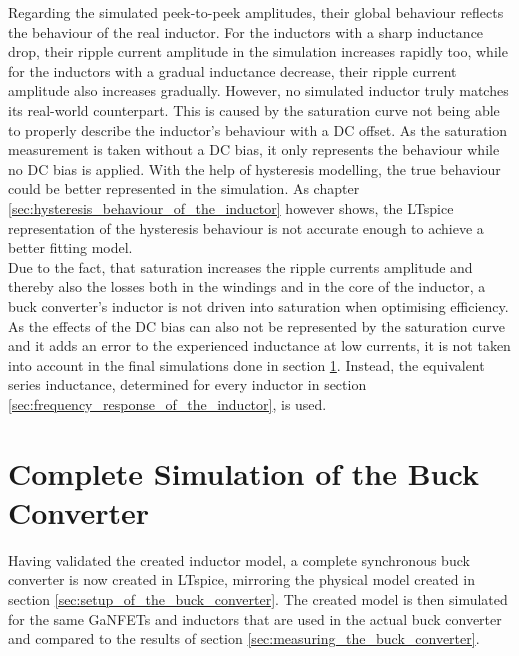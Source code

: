 Regarding the simulated peek-to-peek amplitudes, their global behaviour reflects the behaviour of the real inductor. For the inductors with a sharp inductance drop, their ripple current amplitude in the simulation increases rapidly too, while for the inductors with a gradual inductance decrease, their ripple current amplitude also increases gradually. However, no simulated inductor truly matches its real-world counterpart. This is caused by the saturation curve not being able to properly describe the inductor's behaviour with a \ac{DC} offset. As the saturation measurement is taken without a \ac{DC} bias, it only represents the behaviour while no \ac{DC} bias is applied. With the help of hysteresis modelling, the true behaviour could be better represented in the simulation. As chapter \ref{sec:hysteresis_behaviour_of_the_inductor} however shows, the LTspice representation of the hysteresis behaviour is not accurate enough to achieve a better fitting model.\\
Due to the fact, that saturation increases the ripple currents amplitude and thereby also the losses both in the windings and in the core of the inductor, a buck converter's inductor is not driven into saturation when optimising efficiency. As the effects of the \ac{DC} bias can also not be represented by the saturation curve and it adds an error to the experienced inductance at low currents, it is not taken into account in the final simulations done in section \ref{sec:complete_simulation_of_the_buck_converter}. Instead, the equivalent series inductance, determined for every inductor in section \ref{sec:frequency_response_of_the_inductor}, is used. 

\section{Complete Simulation of the Buck Converter}\label{sec:complete_simulation_of_the_buck_converter}
Having validated the created inductor model, a complete synchronous buck converter is now created in LTspice, mirroring the physical model created in section \ref{sec:setup_of_the_buck_converter}. The created model is then simulated for the same \acp{GaNFET} and inductors that are used in the actual buck converter and compared to the results of section \ref{sec:measuring_the_buck_converter}.
